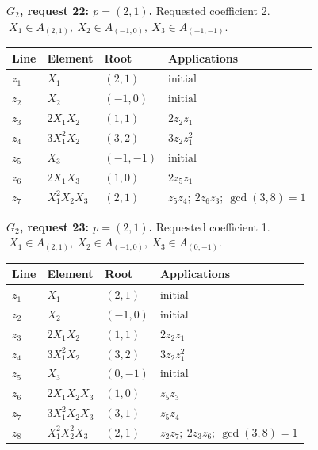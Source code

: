 \par\medskip\noindent\begin{minipage}{\textwidth}
\textbf{\(G_2\), request 22: \(p=(2,1)\).} Requested coefficient 2.
\(\ X_1\in A_{(2,1)},\ X_2\in A_{(-1,0)},\ X_3\in A_{(-1,-1)}.\)\par
\smallskip\centering\small\begin{tabular}{@{}llll@{}}\toprule
Line & Element & Root & Applications\\\midrule
\(z_{1}\) & \(X_1\) & \((2,1)\) & \(\text{initial}\) \\
\(z_{2}\) & \(X_2\) & \((-1,0)\) & \(\text{initial}\) \\
\(z_{3}\) & \(2X_1X_2\) & \((1,1)\) & \(2z_{2}z_{1}\) \\
\(z_{4}\) & \(3X_1^{2}X_2\) & \((3,2)\) & \(3z_{2}z_{1}^{2}\) \\
\(z_{5}\) & \(X_3\) & \((-1,-1)\) & \(\text{initial}\) \\
\(z_{6}\) & \(2X_1X_3\) & \((1,0)\) & \(2z_{5}z_{1}\) \\
\(z_{7}\) & \(X_1^{2}X_2X_3\) & \((2,1)\) & \(z_{5}z_{4};\ 2z_{6}z_{3};\ \gcd(3,8)=1\) \\
\bottomrule\end{tabular}\end{minipage}\par
\par\medskip\noindent\begin{minipage}{\textwidth}
\textbf{\(G_2\), request 23: \(p=(2,1)\).} Requested coefficient 1.
\(\ X_1\in A_{(2,1)},\ X_2\in A_{(-1,0)},\ X_3\in A_{(0,-1)}.\)\par
\smallskip\centering\small\begin{tabular}{@{}llll@{}}\toprule
Line & Element & Root & Applications\\\midrule
\(z_{1}\) & \(X_1\) & \((2,1)\) & \(\text{initial}\) \\
\(z_{2}\) & \(X_2\) & \((-1,0)\) & \(\text{initial}\) \\
\(z_{3}\) & \(2X_1X_2\) & \((1,1)\) & \(2z_{2}z_{1}\) \\
\(z_{4}\) & \(3X_1^{2}X_2\) & \((3,2)\) & \(3z_{2}z_{1}^{2}\) \\
\(z_{5}\) & \(X_3\) & \((0,-1)\) & \(\text{initial}\) \\
\(z_{6}\) & \(2X_1X_2X_3\) & \((1,0)\) & \(z_{5}z_{3}\) \\
\(z_{7}\) & \(3X_1^{2}X_2X_3\) & \((3,1)\) & \(z_{5}z_{4}\) \\
\(z_{8}\) & \(X_1^{2}X_2^{2}X_3\) & \((2,1)\) & \(z_{2}z_{7};\ 2z_{3}z_{6};\ \gcd(3,8)=1\) \\
\bottomrule\end{tabular}\end{minipage}\par
